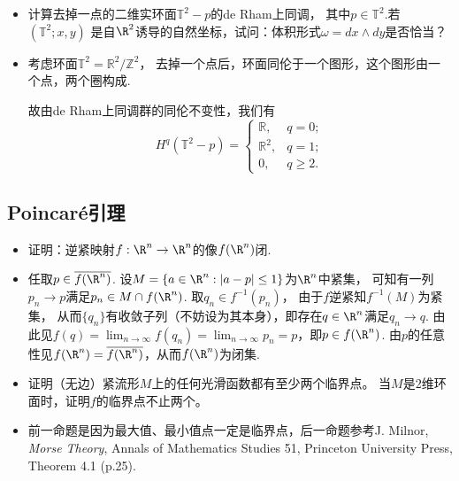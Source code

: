 \begin{itemize}
    \item[3.3] 计算去掉一点的二维实环面$\mathbb{T}^2 - p$的de Rham上同调，
        其中$p \in \mathbb{T}^{2}$.若$(\mathbb{T}^2;x,y)$
        是自$\R^{2}$诱导的自然坐标，试问：体积形式$\omega = dx \wedge dy$是否恰当？
    \item[\textbf{解：}]
        \qquad 考虑环面$\mathbb{T}^2=\mathbb{R}^2/\mathbb{Z}^2$，
        去掉一个点后，环面同伦于一个图形，这个图形由一个点，两个圈构成.\par
        \qquad 故由de Rham上同调群的同伦不变性，我们有
                $$H^q(\mathbb{T}^2-p)=\begin{cases}
                        \mathbb{R},&q=0;\\
                        \mathbb{R}^2, &q=1;\\
                        0,&q\geq 2.
        \end{cases}$$


\end{itemize}

\subsection{Poincaré引理}
\begin{itemize}
    \item[4.8] 证明：逆紧映射$f:\R^{n} \to \R^{n}$的像$f(\R^{n})$闭.
    \item[\textbf{证明：}]
    任取$p\in \overline{f(\R^n)}$. 设$M=\{a\in \R^n: |a-p|\leq 1\}$为$\R^n$中紧集，
    可知有一列$p_n\rightarrow p$满足$p_n\in M\cap f(\R^n)$. 
    取$q_n\in f^{-1}(p_n)$， 由于$f$逆紧知$f^{-1}(M)$为紧集，
    从而$\{q_n\}$有收敛子列（不妨设为其本身），即存在$q\in \R^n$满足$q_n\rightarrow q$. 
    由此见$f(q)=\lim_{n\rightarrow\infty}f(q_n)
    =\lim_{n\rightarrow\infty}p_n=p$，即$p\in f(\R^n)$. 
    由$p$的任意性见$f(\R^n)=\overline{f(\R^n)}$，从而$f(\R^n)$为闭集.

    \item[4.7] 证明（无边）紧流形$M$上的任何光滑函数都有至少两个临界点。
    当$M$是$2$维环面时，证明$f$的临界点不止两个。
    \item[\textbf{证明：}]
        前一命题是因为最大值、最小值点一定是临界点，后一命题参考J. Milnor, 
        \textit{Morse Theory}, Annals of Mathematics Studies 51, 
        Princeton University Press, Theorem 4.1 (p.25).
\end{itemize}

